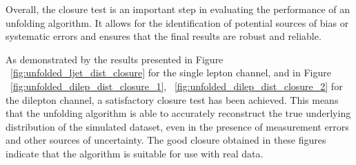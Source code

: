 Overall, the closure test is an important step in evaluating the performance of an unfolding algorithm. It allows for the identification of potential sources of bias or systematic errors and ensures that the final results are robust and reliable.


As demonstrated by the results presented in Figure %
~\ref{fig:unfolded_ljet_dist_closure} for the single lepton channel, and in 
Figure ~\ref{fig:unfolded_dilep_dist_closure_1}, ~\ref{fig:unfolded_dilep_dist_closure_2} 
for the dilepton channel, a satisfactory closure test has been achieved. This means that the unfolding algorithm is able to accurately reconstruct the true underlying distribution of the simulated dataset, even in the presence of measurement errors and other sources of uncertainty. The good closure obtained in these figures indicate that the algorithm is suitable for use with real data.

